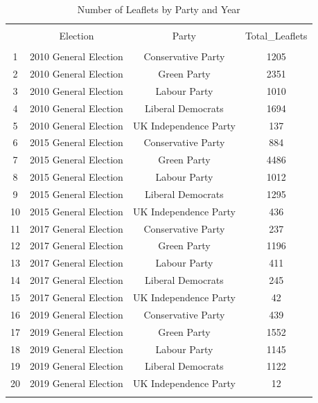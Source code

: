 
\begin{table}[!htbp] \centering 
  \caption{Number of Leaflets by Party and Year} 
  \label{} 
\begin{tabular}{@{\extracolsep{5pt}} cccc} 
\\[-1.8ex]\hline 
\hline \\[-1.8ex] 
 & Election & Party & Total\_Leaflets \\ 
\hline \\[-1.8ex] 
1 &  2010 General Election &  Conservative Party & 1205 \\ 
2 &  2010 General Election &  Green Party & 2351 \\ 
3 &  2010 General Election &  Labour Party & 1010 \\ 
4 &  2010 General Election &  Liberal Democrats & 1694 \\ 
5 &  2010 General Election &  UK Independence Party & 137 \\ 
6 &  2015 General Election &  Conservative Party & 884 \\ 
7 &  2015 General Election &  Green Party & 4486 \\ 
8 &  2015 General Election &  Labour Party & 1012 \\ 
9 &  2015 General Election &  Liberal Democrats & 1295 \\ 
10 &  2015 General Election &  UK Independence Party & 436 \\ 
11 &  2017 General Election &  Conservative Party & 237 \\ 
12 &  2017 General Election &  Green Party & 1196 \\ 
13 &  2017 General Election &  Labour Party & 411 \\ 
14 &  2017 General Election &  Liberal Democrats & 245 \\ 
15 &  2017 General Election &  UK Independence Party & 42 \\ 
16 &  2019 General Election &  Conservative Party & 439 \\ 
17 &  2019 General Election &  Green Party & 1552 \\ 
18 &  2019 General Election &  Labour Party & 1145 \\ 
19 &  2019 General Election &  Liberal Democrats & 1122 \\ 
20 &  2019 General Election &  UK Independence Party & 12 \\ 
\hline \\[-1.8ex] 
\end{tabular} 
\end{table} 
